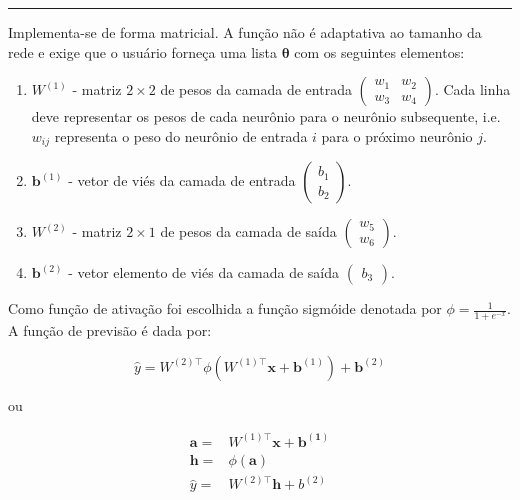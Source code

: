 \documentclass[
  a4paperpaper,
]{article}
\providecommand{\tightlist}{%
  \setlength{\itemsep}{0pt}\setlength{\parskip}{0pt}}\usepackage{longtable,booktabs,array}
\begin{document}
\begin{center}\rule{0.5\linewidth}{0.5pt}\end{center}

Implementa-se de forma matricial. A função não é adaptativa ao tamanho
da rede e exige que o usuário forneça uma lista \(\boldsymbol{\theta}\)
com os seguintes elementos:

\begin{enumerate}
\def\labelenumi{\arabic{enumi}.}
\tightlist
\item
  \(W^{(1)}\) - matriz \(2 \times 2\) de pesos da camada de entrada
  \(\begin{pmatrix} w_1 & w_2 \\ w_3 & w_4 \end{pmatrix}\). Cada linha
  deve representar os pesos de cada neurônio para o neurônio
  subsequente, i.e.~\(w_{ij}\) representa o peso do neurônio de entrada
  \(i\) para o próximo neurônio \(j\).
\item
  \(\boldsymbol{b}^{(1)}\) - vetor de viés da camada de entrada
  \(\begin{pmatrix} b_1 \\ b_2 \end{pmatrix}\).
\item
  \(W^{(2)}\) - matriz \(2 \times 1\) de pesos da camada de saída
  \(\begin{pmatrix} w_5 \\ w_6 \end{pmatrix}\).
\item
  \(\boldsymbol{b}^{(2)}\) - vetor elemento de viés da camada de saída
  \(\begin{pmatrix} b_3 \end{pmatrix}\).
\end{enumerate}

Como função de ativação foi escolhida a função sigmóide denotada por
\(\phi = \frac{1}{1+e^{-x}}\). A função de previsão é dada por:

\[
\hat{y} = W^{(2)\top}\phi(W^{(1)\top}\boldsymbol{x} + \boldsymbol{b}^{(1)}) + \boldsymbol{b}^{(2)}
\]

ou

\begin{align*}
\boldsymbol{a} =& W^{(1)\top} \boldsymbol{x} + \boldsymbol{b^{(1)}} \\
\boldsymbol{h} =& \phi(\boldsymbol{a}) \\
\hat{y} =& W^{(2)\top}\boldsymbol{h} + b^{(2)}
\end{align*}
\end{document}

